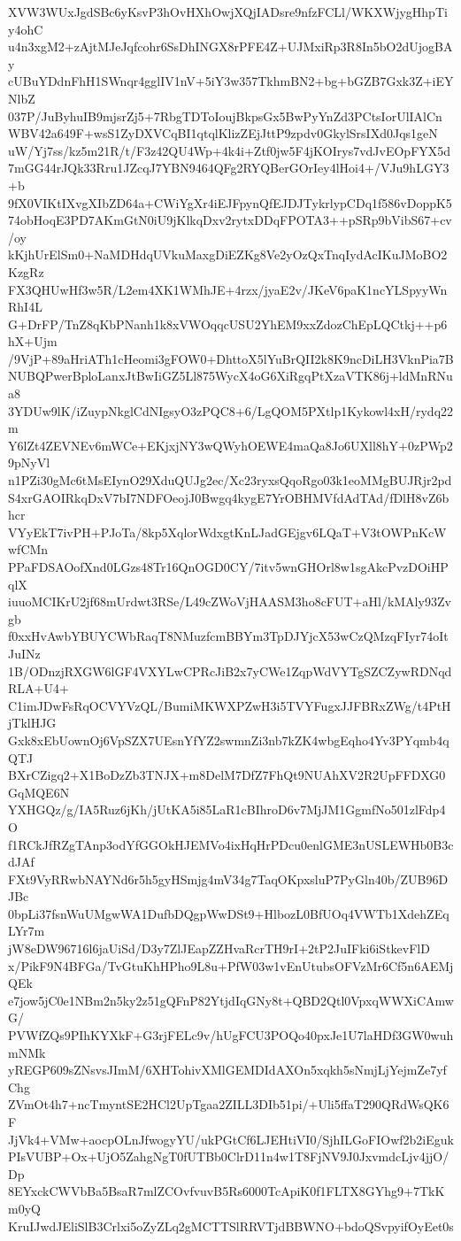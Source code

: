 XVW3WUxJgdSBc6yKsvP3hOvHXhOwjXQjIADsre9nfzFCLl/WKXWjygHhpTiy4ohC
u4n3xgM2+zAjtMJeJqfcohr6SsDhINGX8rPFE4Z+UJMxiRp3R8In5bO2dUjogBAy
cUBuYDdnFhH1SWnqr4gglIV1nV+5iY3w357TkhmBN2+bg+bGZB7Gxk3Z+iEYNlbZ
037P/JuByhuIB9mjsrZj5+7RbgTDToIoujBkpsGx5BwPyYnZd3PCtsIorUlIAlCn
WBV42a649F+wsS1ZyDXVCqBI1qtqlKlizZEjJttP9zpdv0GkylSrsIXd0Jqs1geN
uW/Yj7ss/kz5m21R/t/F3z42QU4Wp+4k4i+Ztf0jw5F4jKOIrys7vdJvEOpFYX5d
7mGG44rJQk33Rru1JZcqJ7YBN9464QFg2RYQBerGOrIey4lHoi4+/VJu9hLGY3+b
9fX0VIKtIXvgXIbZD64a+CWiYgXr4iEJFpynQfEJDJTykrlypCDq1f586vDoppK5
74obHoqE3PD7AKmGtN0iU9jKlkqDxv2rytxDDqFPOTA3++pSRp9bVibS67+cv/oy
kKjhUrElSm0+NaMDHdqUVkuMaxgDiEZKg8Ve2yOzQxTnqIydAcIKuJMoBO2KzgRz
FX3QHUwHf3w5R/L2em4XK1WMhJE+4rzx/jyaE2v/JKeV6paK1ncYLSpyyWnRhI4L
G+DrFP/TnZ8qKbPNanh1k8xVWOqqcUSU2YhEM9xxZdozChEpLQCtkj++p6hX+Ujm
/9VjP+89aHriATh1cHeomi3gFOW0+DhttoX5lYuBrQII2k8K9ncDiLH3VknPia7B
NUBQPwerBploLanxJtBwIiGZ5Ll875WycX4oG6XiRgqPtXzaVTK86j+ldMnRNua8
3YDUw9lK/iZuypNkglCdNIgsyO3zPQC8+6/LgQOM5PXtlp1Kykowl4xH/rydq22m
Y6lZt4ZEVNEv6mWCe+EKjxjNY3wQWyhOEWE4maQa8Jo6UXll8hY+0zPWp29pNyVl
n1PZi30gMc6tMsEIynO29XduQUJg2ec/Xc23ryxsQqoRgo03k1eoMMgBUJRjr2pd
S4xrGAOIRkqDxV7bI7NDFOeojJ0Bwgq4kygE7YrOBHMVfdAdTAd/fDlH8vZ6bhcr
VYyEkT7ivPH+PJoTa/8kp5XqlorWdxgtKnLJadGEjgv6LQaT+V3tOWPnKcWwfCMn
PPaFDSAOofXnd0LGzs48Tr16QnOGD0CY/7itv5wnGHOrl8w1sgAkcPvzDOiHPqlX
iuuoMCIKrU2jf68mUrdwt3RSe/L49cZWoVjHAASM3ho8cFUT+aHl/kMAly93Zvgb
f0xxHvAwbYBUYCWbRaqT8NMuzfcmBBYm3TpDJYjcX53wCzQMzqFIyr74oItJuINz
1B/ODnzjRXGW6lGF4VXYLwCPRcJiB2x7yCWe1ZqpWdVYTgSZCZywRDNqdRLA+U4+
C1imJDwFsRqOCVYVzQL/BumiMKWXPZwH3i5TVYFugxJJFBRxZWg/t4PtHjTklHJG
Gxk8xEbUownOj6VpSZX7UEsnYfYZ2swmnZi3nb7kZK4wbgEqho4Yv3PYqmb4qQTJ
BXrCZigq2+X1BoDzZb3TNJX+m8DelM7DfZ7FhQt9NUAhXV2R2UpFFDXG0GqMQE6N
YXHGQz/g/IA5Ruz6jKh/jUtKA5i85LaR1cBIhroD6v7MjJM1GgmfNo501zlFdp4O
f1RCkJfRZgTAnp3odYfGGOkHJEMVo4ixHqHrPDcu0enlGME3nUSLEWHb0B3cdJAf
FXt9VyRRwbNAYNd6r5h5gyHSmjg4mV34g7TaqOKpxsluP7PyGln40b/ZUB96DJBc
0bpLi37fsnWuUMgwWA1DufbDQgpWwDSt9+HlbozL0BfUOq4VWTb1XdehZEqLYr7m
jW8eDW96716l6jaUiSd/D3y7ZlJEapZZHvaRcrTH9rI+2tP2JuIFki6iStkevFlD
x/PikF9N4BFGa/TvGtuKhHPho9L8u+PfW03w1vEnUtubsOFVzMr6Cf5n6AEMjQEk
e7jow5jC0e1NBm2n5ky2z51gQFnP82YtjdIqGNy8t+QBD2Qtl0VpxqWWXiCAmwG/
PVWfZQs9PIhKYXkF+G3rjFELc9v/hUgFCU3POQo40pxJe1U7laHDf3GW0wuhmNMk
yREGP609sZNsvsJImM/6XHTohivXMlGEMDIdAXOn5xqkh5sNmjLjYejmZe7yfChg
ZVmOt4h7+ncTmyntSE2HCl2UpTgaa2ZILL3DIb51pi/+Uli5ffaT290QRdWsQK6F
JjVk4+VMw+aocpOLnJfwogyYU/ukPGtCf6LJEHtiVI0/SjhILGoFIOwf2b2iEguk
PIsVUBP+Ox+UjO5ZahgNgT0fUTBb0ClrD11n4w1T8FjNV9J0JxvmdcLjv4jjO/Dp
8EYxckCWVbBa5BsaR7mlZCOvfvuvB5Rs6000TcApiK0f1FLTX8GYhg9+7TkKm0yQ
KruIJwdJEliSlB3Crlxi5oZyZLq2gMCTTSlRRVTjdBBWNO+bdoQSvpyifOyEet0s
